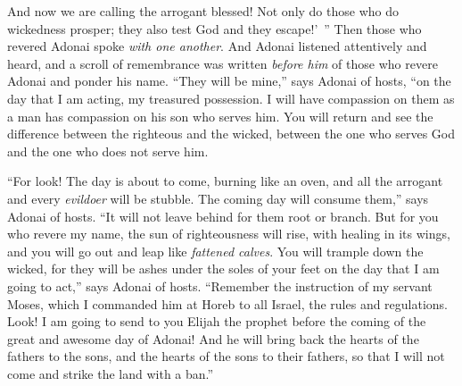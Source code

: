 \begin{biblechapter}
\verse And now we are calling the arrogant blessed! Not only do those who do wickedness prosper; they also test God and they escape!’ ”
 Then those who revered Adonai spoke \textit{with one another}. And Adonai listened attentively and heard, and a scroll of remembrance was written \textit{before him} of those who revere Adonai and ponder his name.
\verse “They will be mine,” says Adonai of hosts, “on the day that I am acting, my treasured possession. I will have compassion on them as a man has compassion on his son who serves him.
\verse You will return and see the difference between the righteous and the wicked, between the one who serves God and the one who does not serve him.
\end{biblechapter}

\begin{biblechapter} %
\verse  “For look! The day is about to come, burning like an oven, and all the arrogant and every \textit{evildoer} will be stubble. The coming day will consume them,” says Adonai of hosts. “It will not leave behind for them root or branch.
\verse But for you who revere my name, the sun of righteousness will rise, with healing in its wings, and you will go out and leap like \textit{fattened calves}.
\verse You will trample down the wicked, for they will be ashes under the soles of your feet on the day that I am going to act,” says Adonai of hosts.
\verse “Remember the instruction of my servant Moses, which I commanded him at Horeb to all Israel, the rules and regulations.
\verse Look! I am going to send to you Elijah the prophet before the coming of the great and awesome day of Adonai!
\verse And he will bring back the hearts of the fathers to the sons, and the hearts of the sons to their fathers, so that I will not come and strike the land with a ban.”
\end{biblechapter}

